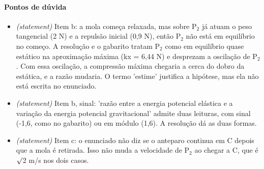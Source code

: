 \documentclass{article}%
\begin{document}
\paragraph{Pontos de dúvida}%
\begin{itemize}%
\item%
\textit{(statement)} Item b: a mola começa relaxada, mas sobre P$_{2}$ já atuam o peso tangencial (2 N) e a repulsão inicial (0,9 N), então P$_{2}$ não está em equilíbrio no começo. A resolução e o gabarito tratam P$_{2}$ como em equilíbrio quase estático na aproximação máxima (kx = 6,44 N) e desprezam a oscilação de P$_{2}$. Com essa oscilação, a compressão máxima chegaria a cerca do dobro da estática, e a razão mudaria. O termo 'estime' justifica a hipótese, mas ela não está escrita no enunciado.%
\item%
\textit{(statement)} Item b, sinal: 'razão entre a energia potencial elástica e a variação da energia potencial gravitacional' admite duas leituras, com sinal (-1,6, como no gabarito) ou em módulo (1,6). A resolução dá as duas formas.%
\item%
\textit{(statement)} Item c: o enunciado não diz se o anteparo continua em C depois que a mola é retirada. Isso não muda a velocidade de P$_{2}$ ao chegar a C, que é $\surd$2 m/s nos dois casos.%
\end{itemize}%
\end{document}
